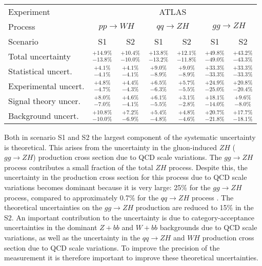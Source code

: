 \begin{table}[th!]
\begin{center}
{\vspace{5mm}
\begin{subtable}
\renewcommand{\arraystretch}{1.5}
\begin{tabular}{l | c c c c c c }
\hline\hline
Experiment &  \multicolumn{6}{c}{ATLAS}\\
Process  & \multicolumn{2}{c}{$pp\to WH$}& \multicolumn{2}{c}{$qq\to ZH$}& \multicolumn{2}{c}{$gg\to ZH$}\\ 
\hline
Scenario &  S1 & S2  & S1 & S2 & S1 & S2 \\
Total uncertainty   & $^{+14.9\%}_
{-13.8\%}$& $^{+10.4\%}_
{-10.0\%}$ &$^{+13.8\%}_
{-13.2\%}$ & $^{+12.1\%}_
{-11.8\%}$ & $^{+49.8\%}_
{-49.0\%}$ & $^{+43.2\%}_
{-43.3\%}$\\
\hline 
Statistical uncert.  &$^{+4.1\%}_
{-4.1\%}$ & $^{+4.1\%}_
{-4.1\%}$ &$^{+9.0\%}_
{-8.9\%}$ & $^{+9.0\%}_
{-8.9\%}$ & $^{+33.3\%}_
{-33.3\%}$ & $^{+33.3\%}_
{-33.3\%}$ \\
Experimental uncert. & $^{+4.8\%}_
{-4.7\%}$  & $^{+4.4\%}_
{-4.3\%}$ & $^{+6.5\%}_
{-6.3\%}$ & $^{+5.7\%}_
{-5.5\%}$ & $^{+24.9\%}_
{-25.0\%}$ & $^{+20.8\%}_
{-20.4\%}$ \\
Signal theory uncer. & $^{+8.0\%}_
{-7.0\%}$ & $^{+4.6\%}_
{-4.1\%}$ & $^{+6.1\%}_
{-5.5\%}$ & $^{+3.1\%}_
{-2.8\%}$ & $^{+18.1\%}_
{-14.0\%}$ & $^{+9.6\%}_
{-8.0\%}$ \\
Background uncert.  & $^{+10.8\%}_
{-10.0\%}$ & $^{+7.2\%}_
{-6.9\%}$ & $^{+5.4\%}_
{-4.8\%}$ & $^{+4.8\%}_
{-4.6\%}$ & $^{+20.7\%}_
{-21.8\%}$ & $^{+17.7\%}_
{-18.1\%}$ \\
\hline\hline
\end{tabular}
\end{subtable}
} %
\end{center}
\end{table}

Both in scenario S1 and S2 the largest component of the systematic uncertainty is theoretical. This arises from the uncertainty in the gluon-induced $ZH$ ($gg\to ZH$) production cross section due to QCD scale variations. The $gg\to ZH$ process contributes a small fraction of the total $ZH$ process. Despite this, the uncertainty in the production cross section for this process due to QCD scale variations  becomes dominant because it is very large: 25\% for the $gg\to ZH$ process, compared to approximately 0.7\% for the $qq\to ZH$ process \cite{deFlorian:2016spz}. The theoretical uncertainties on the $gg\to ZH$ production are reduced to 15\% in the S2.
An important contribution to the uncertainty is due to category-acceptance uncertainties in the dominant $Z+bb$ and $W+bb$ backgrounds due to QCD scale variations, as well as the uncertainty in the $qq\to ZH$ and $WH$ production
cross section due to QCD scale variations. 
To improve the precision of the measurement it is therefore important to improve these theoretical uncertainties.


